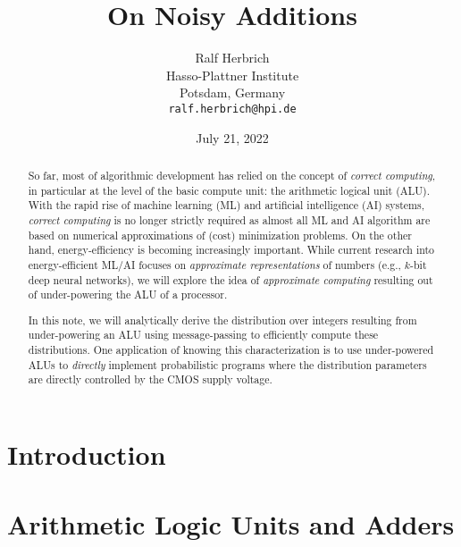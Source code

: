 \documentclass{article}
\title{On Noisy Additions}
\date{July 21, 2022}		%
\author{Ralf Herbrich \\
	Hasso-Plattner Institute\\
	Potsdam, Germany \\
	\texttt{ralf.herbrich@hpi.de} \\
}
\newcommand{\0}{\boldsymbol{0}}
\newcommand{\1}{\boldsymbol{1}}
\begin{document}
\maketitle

\begin{abstract}
	So far, most of algorithmic development has relied on the concept of {\em correct computing}, in particular at the level of the basic compute unit: the arithmetic logical unit (ALU). With the rapid rise of machine learning (ML) and artificial intelligence (AI) systems, {\em correct computing} is no longer strictly required as almost all ML and AI algorithm are based on numerical approximations of (cost) minimization problems. On the other hand, energy-efficiency is becoming increasingly important. While current research into energy-efficient ML/AI focuses on {\em approximate representations} of numbers (e.g., $k$-bit deep neural networks), we will explore the idea of {\em approximate computing} resulting out of under-powering the ALU of a processor. 
	
	In this note, we will analytically derive the distribution over integers resulting from under-powering an ALU using message-passing to efficiently compute these distributions. One application of knowing this characterization is to use under-powered ALUs to {\em directly} implement probabilistic programs where the distribution parameters are directly controlled by the CMOS supply voltage. 
	
\end{abstract}




\section{Introduction}


\section{Arithmetic Logic Units and Adders}

\end{document}
